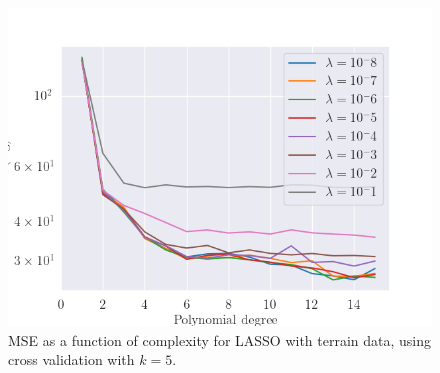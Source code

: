 %
\begin{figure}[H]
    \centering
    \includegraphics[width=\linewidth]{images/cv_lasso_real.png}
    \caption{MSE as a function of complexity for LASSO with terrain data, using cross validation with $k=5$.}
    \label{fig:cv_lasso_terrain}
\end{figure}

